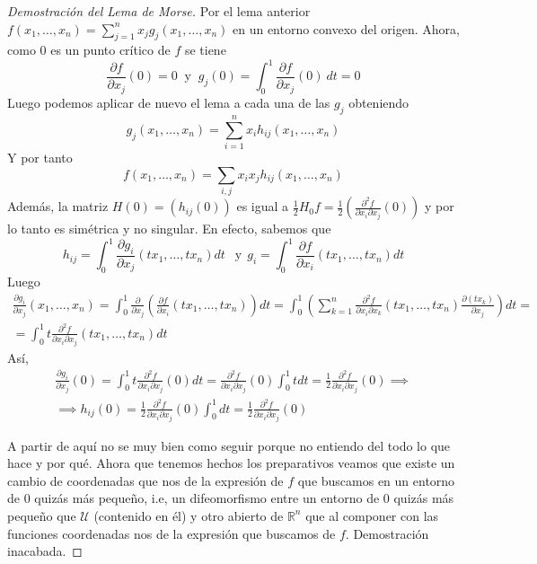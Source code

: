 \begin{proof}[Demostración del Lema de Morse]
    Por el lema anterior $f(x_1,\dots,x_n)=\sum_{j=1}^n x_jg_j(x_1,\dots,x_n)$ en un entorno convexo del origen. Ahora, como $0$ es un punto crítico de $f$ se tiene
    \begin{equation*}
        \frac{\partial f}{\partial x_j}(0)=0 ~\text{ y }~ g_j(0)=\int_0^1 \frac{\partial f}{\partial x_j}(0)~dt=0
    \end{equation*}
    Luego podemos aplicar de nuevo el lema a cada una de las $g_j$ obteniendo
    \begin{equation*}
        g_j(x_1,\dots,x_n)=\sum_{i=1}^n x_ih_{ij}(x_1,\dots,x_n)
    \end{equation*}
    Y por tanto
    \begin{equation*}
        f(x_1,\dots,x_n)=\sum_{i,j} x_ix_jh_{ij}(x_1,\dots,x_n)
    \end{equation*}
    Además, la matriz $H(0)=(h_{ij}(0))$ es igual a $\frac{1}{2}H_0f=\frac{1}{2}(\frac{\partial^2f}{\partial x_i\partial x_j}(0))$ y por lo tanto es simétrica y no singular. En efecto, sabemos que 
    \begin{equation*}
        h_{ij}=\int_0^1 \frac{\partial g_i}{\partial x_j}(tx_1,\dots,tx_n)dt ~~\text{ y}~~ g_{i}=\int_0^1 \frac{\partial f}{\partial x_i}(tx_1,\dots,tx_n)dt
    \end{equation*}
    Luego
    \begin{gather*}
        \frac{\partial g_i}{\partial x_j}(x_1,\dots,x_n)= \int_0^1 \frac{\partial}{\partial x_j}\left(\frac{\partial f}{\partial x_i}(tx_1,\dots,tx_n)\right)dt = \int_0^1 \left(\sum_{k=1}^n\frac{\partial^2 f}{\partial x_i \partial x_k}(tx_1,\dots,tx_n) \frac{\partial(tx_k)}{\partial x_j}\right)dt =\\
        = \int_0^1t\frac{\partial^2 f}{\partial x_i \partial x_j}(tx_1,\dots,tx_n)dt
    \end{gather*}
    Así, 
    \begin{gather*}
        \frac{\partial g_i}{\partial x_j}(0)=\int_0^1 t\frac{\partial^2 f}{\partial x_i \partial x_j}(0)dt=\frac{\partial^2 f}{\partial x_i \partial x_j}(0)\int_0^1tdt= \frac{1}{2}\frac{\partial^2 f}{\partial x_i \partial x_j}(0)\implies\\
        \implies h_{ij}(0)=\frac{1}{2}\frac{\partial^2 f}{\partial x_i \partial x_j}(0)\int_0^1 dt =\frac{1}{2}\frac{\partial^2 f}{\partial x_i \partial x_j}(0)
    \end{gather*}

    {\color{blue}A partir de aquí no se muy bien como seguir porque no entiendo del todo lo que hace y por qué.}
    Ahora que tenemos hechos los preparativos veamos que existe un cambio de coordenadas que nos de la expresión de $f$ que buscamos en un entorno de $0$ quizás más pequeño, i.e, un difeomorfismo entre un entorno de $0$ quizás más pequeño que $\mathcal{U}$ (contenido en él) y otro abierto de $\mathbb{R}^n$ que al componer con las funciones coordenadas nos de la expresión que buscamos de $f$. 
    {\color{blue}Demostración inacabada.}

    
    \end{proof}

